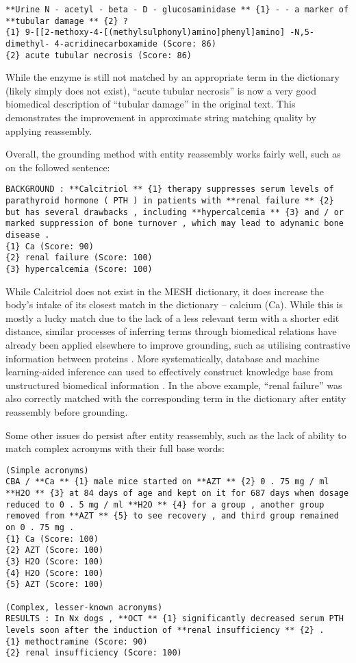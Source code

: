 \documentclass[10pt, oneside]{article}
\begin{document}
\begin{lstlisting}[breaklines]
**Urine N - acetyl - beta - D - glucosaminidase ** {1} - - a marker of **tubular damage ** {2} ? 
{1} 9-[[2-methoxy-4-[(methylsulphonyl)amino]phenyl]amino] -N,5-dimethyl- 4-acridinecarboxamide (Score: 86)
{2} acute tubular necrosis (Score: 86)
\end{lstlisting}

While the enzyme is still not matched by an appropriate term in the dictionary (likely simply does not exist), ``acute tubular necrosis'' is now a very good biomedical description of ``tubular damage'' in the original text. This demonstrates the improvement in approximate string matching quality by applying reassembly.

Overall, the grounding method with entity reassembly works fairly well, such as on the followed sentence:

\begin{lstlisting}[breaklines]
BACKGROUND : **Calcitriol ** {1} therapy suppresses serum levels of parathyroid hormone ( PTH ) in patients with **renal failure ** {2} but has several drawbacks , including **hypercalcemia ** {3} and / or marked suppression of bone turnover , which may lead to adynamic bone disease . 
{1} Ca (Score: 90)
{2} renal failure (Score: 100)
{3} hypercalcemia (Score: 100)
\end{lstlisting}

While Calcitriol does not exist in the MESH dictionary, it does increase the body's intake of its closest match in the dictionary -- calcium (Ca). While this is mostly a lucky match due to the lack of a less relevant term with a shorter edit distance, similar processes of inferring terms through biomedical relations have already been applied elsewhere to improve grounding, such as utilising contrastive information between proteins \cite{kim2005biocontrasts}. More systematically, database and machine learning-aided inference can used to effectively construct knowledge base from unstructured biomedical information \cite{shin2015incremental}. In the above example, ``renal failure'' was also correctly matched with the corresponding term in the dictionary after entity reassembly before grounding.

Some other issues do persist after entity reassembly, such as the lack of ability to match complex acronyms with their full base words:

\begin{lstlisting}[breaklines]
(Simple acronyms)
CBA / **Ca ** {1} male mice started on **AZT ** {2} 0 . 75 mg / ml **H2O ** {3} at 84 days of age and kept on it for 687 days when dosage reduced to 0 . 5 mg / ml **H2O ** {4} for a group , another group removed from **AZT ** {5} to see recovery , and third group remained on 0 . 75 mg . 
{1} Ca (Score: 100)
{2} AZT (Score: 100)
{3} H2O (Score: 100)
{4} H2O (Score: 100)
{5} AZT (Score: 100)

(Complex, lesser-known acronyms)
RESULTS : In Nx dogs , **OCT ** {1} significantly decreased serum PTH levels soon after the induction of **renal insufficiency ** {2} . 
{1} methoctramine (Score: 90)
{2} renal insufficiency (Score: 100)
\end{lstlisting}
\end{document}

